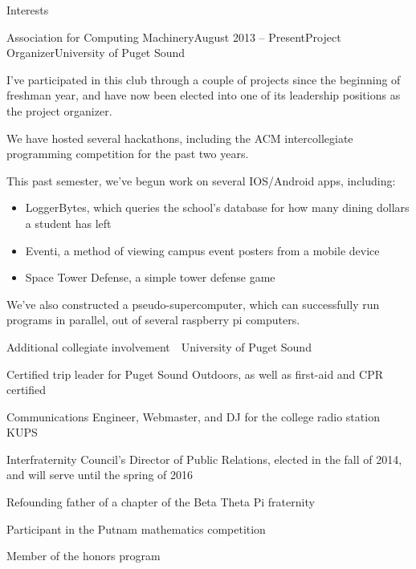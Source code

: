\documentclass{resume} %
\begin{document}
\begin{rSection}{Interests}

\begin{rSubsection}{Association for Computing Machinery}{August 2013 -- Present}{Project Organizer}{University of Puget Sound}

\item I've participated in this club through a couple of projects since the beginning of freshman year, and have now been elected into one of its leadership positions as the project organizer. 
\item We have hosted several hackathons, including the ACM intercollegiate programming competition for the past two years. 
\item This past semester, we've begun work on several IOS/Android apps, including:
  \begin{itemize}
    \item LoggerBytes, which queries the school's database for how many dining dollars a student has left 
    \item Eventi, a method of viewing campus event posters from a mobile device
    \item Space Tower Defense, a simple tower defense game
  \end{itemize}
\item We've also constructed a pseudo-supercomputer, which can successfully run programs in parallel, out of several raspberry pi computers. 
\end{rSubsection}
\begin{rSubsection}{Additional collegiate involvement}{\ }{\ }{University of Puget Sound}
\item Certified trip leader for Puget Sound Outdoors, as well as first-aid and CPR certified
\item Communications Engineer, Webmaster, and DJ for the college radio station KUPS
\item Interfraternity Council's Director of Public Relations, elected in the fall of 2014, and will serve until the spring of 2016
\item Refounding father of a chapter of the Beta Theta Pi fraternity
\item Participant in the Putnam mathematics competition
\item Member of the honors program
\end{rSubsection}



\end{rSection}
\end{document}
